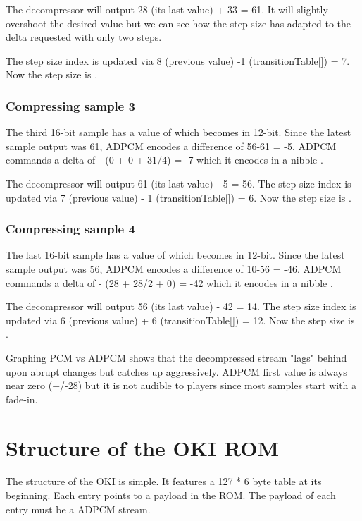 The decompressor will output 28 (its last value) + 33 = 61. It will slightly overshoot the desired value but we can see how the step size has adapted to the delta requested with only two steps. 

The step size index is updated via 8 (previous value) -1 (transitionTable[]) = 7. Now the step size is .

\subsubsection{Compressing sample 3}
The third 16-bit sample has a value of  which becomes  in 12-bit. Since the latest sample output was 61, ADPCM encodes a difference of 56-61 = -5. ADPCM commands a delta of - (0 + 0 + 31/4) = -7 which it encodes in a nibble . 

The decompressor will output 61 (its last value) - 5 = 56. The step size index is updated via 7 (previous value) - 1  (transitionTable[]) = 6. Now the step size is .

\subsubsection{Compressing sample 4}
The last 16-bit sample has a value of  which becomes  in 12-bit. Since the latest sample output was 56, ADPCM encodes a difference of 10-56 = -46. ADPCM commands a delta of - (28 + 28/2 + 0) = -42 which it encodes in a nibble . 

The decompressor will output 56 (its last value) - 42 = 14. The step size index is updated via 6 (previous value) + 6 (transitionTable[]) = 12. Now the step size is .

Graphing PCM vs ADPCM shows that the decompressed stream "lags" behind upon abrupt changes but catches up aggressively. ADPCM first value is always near zero (+/-28) but it is not audible to players since most samples start with a fade-in. 


\section{Structure of the OKI ROM}
The structure of the OKI is simple. It features a 127 * 6 byte table at its beginning. Each entry points to a payload in the ROM. The payload of each entry must be a ADPCM stream.

